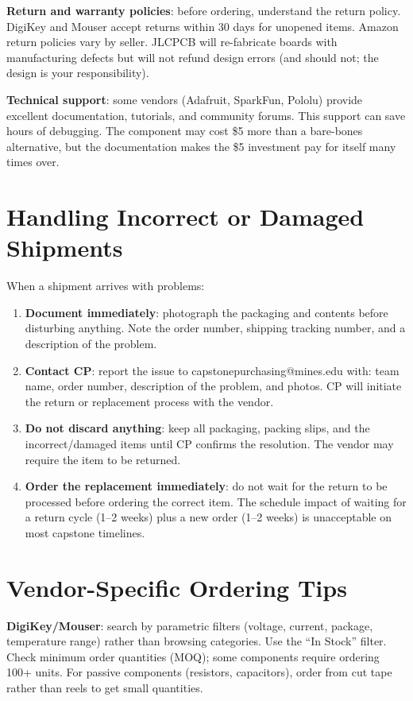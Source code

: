 \textbf{Return and warranty policies}: before ordering, understand the return policy. DigiKey and Mouser accept returns within 30 days for unopened items. Amazon return policies vary by seller. JLCPCB will re-fabricate boards with manufacturing defects but will not refund design errors (and should not; the design is your responsibility).

\textbf{Technical support}: some vendors (Adafruit, SparkFun, Pololu) provide excellent documentation, tutorials, and community forums. This support can save hours of debugging. The component may cost \$5 more than a bare-bones alternative, but the documentation makes the \$5 investment pay for itself many times over.

\section{Handling Incorrect or Damaged Shipments}
When a shipment arrives with problems:

\begin{enumerate}[nosep,leftmargin=1.5em]
\item \textbf{Document immediately}: photograph the packaging and contents before disturbing anything. Note the order number, shipping tracking number, and a description of the problem.
\item \textbf{Contact CP}: report the issue to capstonepurchasing@mines.edu with: team name, order number, description of the problem, and photos. CP will initiate the return or replacement process with the vendor.
\item \textbf{Do not discard anything}: keep all packaging, packing slips, and the incorrect/damaged items until CP confirms the resolution. The vendor may require the item to be returned.
\item \textbf{Order the replacement immediately}: do not wait for the return to be processed before ordering the correct item. The schedule impact of waiting for a return cycle (1--2 weeks) plus a new order (1--2 weeks) is unacceptable on most capstone timelines.
\end{enumerate}



\section{Vendor-Specific Ordering Tips}
\textbf{DigiKey/Mouser}: search by parametric filters (voltage, current, package, temperature range) rather than browsing categories. Use the ``In Stock'' filter. Check minimum order quantities (MOQ); some components require ordering 100+ units. For passive components (resistors, capacitors), order from cut tape rather than reels to get small quantities.


